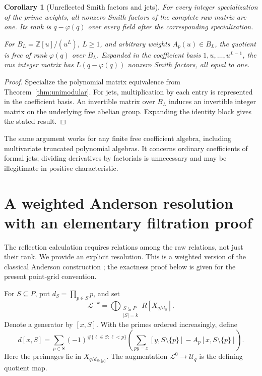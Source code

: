 \documentclass[11pt]{article}
\numberwithin{equation}{section}
\newtheorem{corollary}[theorem]{Corollary}
\theoremstyle{definition}
\theoremstyle{remark}
\newcommand{\Z}{\mathbb Z}
\newcommand{\U}{\mathcal U}
\newcommand{\Lcal}{\mathcal L}
\begin{document}
\begin{corollary}[Unreflected Smith factors and jets]
\label{cor:unreflected}
For every integer specialization of the prime weights, all nonzero Smith
factors of the complete raw matrix are one. Its rank is
$q-\varphi(q)$ over every field after the corresponding specialization.

For $B_L=\Z[u]/(u^L)$, $L\ge1$, and arbitrary weights $A_p(u)\in B_L$,
the quotient is free of rank $\varphi(q)$ over $B_L$. Expanded in the
coefficient basis $1,u,\ldots,u^{L-1}$, the raw integer matrix has
$L(q-\varphi(q))$ nonzero Smith factors, all equal to one.
\end{corollary}
\begin{proof}
Specialize the polynomial matrix equivalence from
Theorem~\ref{thm:unimodular}. For jets, multiplication by each entry is
represented in the coefficient basis. An invertible matrix over $B_L$
induces an invertible integer matrix on the underlying free abelian
group. Expanding the identity block gives the stated result.
\end{proof}

The same argument works for any finite free coefficient algebra, including
multivariate truncated polynomial algebras. It concerns ordinary
coefficients of formal jets; dividing derivatives by factorials is
unnecessary and may be illegitimate in positive characteristic.

\section{A weighted Anderson resolution with an elementary filtration proof}
\label{sec:resolution}
The reflection calculation requires relations among the raw relations,
not just their rank. We provide an explicit resolution. This is a
weighted version of the classical Anderson construction
\cite{OuyangNorm}; the exactness proof below is given for the present
point-grid convention.

For $S\subseteq P$, put $d_S=\prod_{p\in S}p$, and set
\begin{equation}
 \Lcal^{-k}=\bigoplus_{\substack{S\subseteq P\\|S|=k}}R[X_{q/d_S}].
 \label{eq:resolution-terms}
\end{equation}
Denote a generator by $[x,S]$. With the primes ordered increasingly,
define
\begin{equation}
 d[x,S]=\sum_{p\in S}(-1)^{\#\{\ell\in S:\ell<p\}}
 \left(\sum_{py=x}[y,S\setminus\{p\}]
       -A_p[x,S\setminus\{p\}]\right).
 \label{eq:resolution-d}
\end{equation}
Here the preimages lie in $X_{q/d_{S\setminus\{p\}}}$.
The augmentation $\Lcal^0\to\U_q$ is the defining quotient map.
\end{document}
